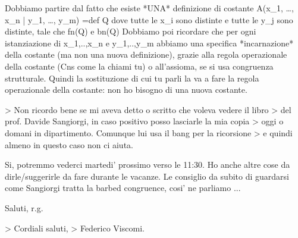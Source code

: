 Dobbiamo partire dal fatto che esiste *UNA* definizione di
costante
    A(x_1, …, x_n | y_1, …, y_m) =def Q
dove tutte le x_i sono distinte e tutte le y_j sono distinte, tale che
fn(Q)    e  bn(Q) 
Dobbiamo poi ricordare che per ogni istanziazione di x_1,..,x_n
e y_1,..,y_m abbiamo una specifica *incarnazione* della
costante (ma non una nuova definizione), grazie alla regola operazionale
della costante (Cns come la chiami tu) o all'assioma,
se si usa congruenza strutturale. Quindi la sostituzione di cui tu parli
la va a fare la regola operazionale della costante: non ho bisogno di una
nuova costante.


> Non ricordo bene se mi aveva detto o scritto che voleva vedere il libro
> del prof. Davide Sangiorgi, in caso positivo posso lasciarle la mia copia
> oggi o domani in dipartimento. Comunque lui usa il bang per la ricorsione
> e quindi almeno in questo caso non ci aiuta.


Si, potremmo vederci martedi' prossimo verso le 11:30. Ho anche altre cose
da dirle/suggerirle da fare durante le vacanze. Le consiglio da subito di
guardarsi come Sangiorgi tratta la barbed congruence, cosi' ne parliamo
...

Saluti,
r.g.


> Cordiali saluti,
> Federico Viscomi.